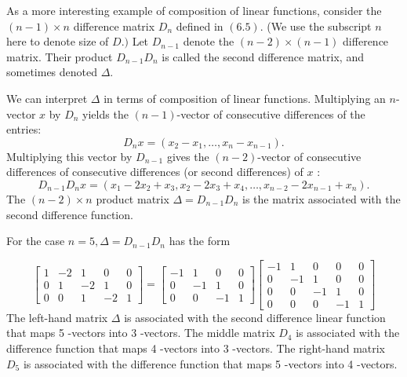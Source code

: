 As a more interesting example of composition of linear functions, consider the $ (n-1) \times n $ difference matrix $ D_{n} $ defined in $ (6.5) $. (We use the subscript $ n $ here to denote size of $ D .) $ Let $ D_{n-1} $ denote the $ (n-2) \times(n-1) $ difference matrix. Their product $ D_{n-1} D_{n} $ is called the second difference matrix, and sometimes denoted $ \Delta $.

We can interpret $ \Delta $ in terms of composition of linear functions. Multiplying an $ n $-vector $ x $ by $ D_{n} $ yields the $ (n-1) $-vector of consecutive differences of the entries:
$$
D_{n} x=\left(x_{2}-x_{1}, \ldots, x_{n}-x_{n-1}\right) .
$$
Multiplying this vector by $ D_{n-1} $ gives the $ (n-2) $-vector of consecutive differences of consecutive differences (or second differences) of $ x $ :
$$
D_{n-1} D_{n} x=\left(x_{1}-2 x_{2}+x_{3}, x_{2}-2 x_{3}+x_{4}, \ldots, x_{n-2}-2 x_{n-1}+x_{n}\right) .
$$
The $ (n-2) \times n $ product matrix $ \Delta=D_{n-1} D_{n} $ is the matrix associated with the second difference function.

\begin{example}
    For the case $ n=5, \Delta=D_{n-1} D_{n} $ has the form

    $$
\left[\begin{array}{rrrrr}
1 & -2 & 1 & 0 & 0 \\
0 & 1 & -2 & 1 & 0 \\
0 & 0 & 1 & -2 & 1
\end{array}\right]=\left[\begin{array}{rrrr}
-1 & 1 & 0 & 0 \\
0 & -1 & 1 & 0 \\
0 & 0 & -1 & 1
\end{array}\right]\left[\begin{array}{rrrrr}
-1 & 1 & 0 & 0 & 0 \\
0 & -1 & 1 & 0 & 0 \\
0 & 0 & -1 & 1 & 0 \\
0 & 0 & 0 & -1 & 1
\end{array}\right]
$$
The left-hand matrix $ \Delta $ is associated with the second difference linear function that maps 5 -vectors into 3 -vectors. The middle matrix $ D_{4} $ is associated with the difference function that maps 4 -vectors into 3 -vectors. The right-hand matrix $ D_{5} $ is associated with the difference function that maps 5 -vectors into 4 -vectors.

\end{example}

